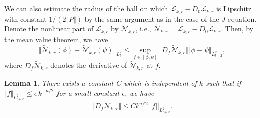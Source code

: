 \documentclass{amsart}
\numberwithin{equation}{section}
\theoremstyle{plain}
\newtheorem{lemma}[equation]{Lemma}
\theoremstyle{definition}
\theoremstyle{remark}
\begin{document}
We can also estimate the radius of the ball on which $\tilde{\mathcal{L}}_{k,r}-D_0\tilde{\mathcal{L}}_{k,r}$ is Lipschitz with constant $1/(2\Vert P\Vert)$ by the same argument as in the case of the $J$-equation. Denote the nonlinear part of $\tilde{\mathcal{L}}_{k,r}$ by $\tilde{\mathcal{N}}_{k,r}$, i.e., $\tilde{\mathcal{N}}_{k,r}=\tilde{\mathcal{L}}_{k,r}-D_0\tilde{\mathcal{L}}_{k,r}$. Then, by the mean value theorem, we have
$$\Vert\tilde{\mathcal{N}}_{k,r}(\phi)-\tilde{\mathcal{N}}_{k,r}(\psi)\Vert_{L^2_l}\le\sup_{f\in[\phi,\psi]}\Vert D_f\tilde{\mathcal{N}}_{k,r}\Vert\Vert\phi-\psi\Vert_{L^2_{l+2}},$$
where $D_f\tilde{\mathcal{N}}_{k,r}$ denotes the derivative of $\tilde{\mathcal{N}}_{k,r}$ at $f$.

\begin{lemma}
    There exists a constant $C$ which is independent of $k$ such that if 
    $ \Vert f \Vert_{L^2_{l+2}} \le \epsilon \, k^{-n/2}$ for a small constant $\epsilon$, 
    we have 
    $$\Vert D_f \tilde{\mathcal{N}}_{k,r} \Vert \le C k^{n/2} ||f||_{L^2_{l+2}}.$$
\end{lemma}
\end{document}
